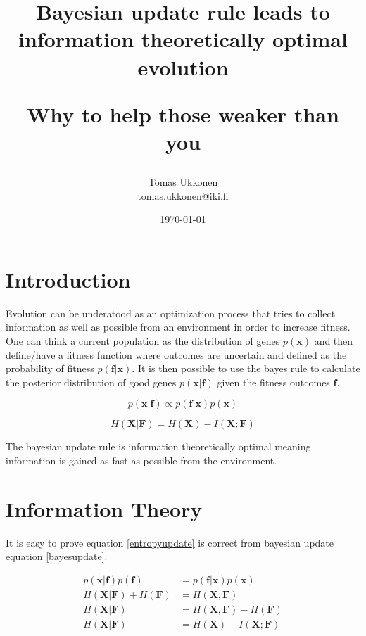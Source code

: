 \documentclass{article}
\title{Bayesian update rule leads to information theoretically optimal evolution\\ \begin{normalsize}Why to help those weaker than you\end{normalsize} }
\author{Tomas Ukkonen\\ \textrm{tomas.ukkonen@iki.fi} }
\date{\today}
\begin{document}
\maketitle

\section{Introduction} \label{introduction}

Evolution can be underatood as an optimization process that tries to collect information  \cite{infobook03} as well as possible from  an environment in order to increase fitness. One can think a current population as the distribution of genes $p(\mathbf{x})$ and then define/have a fitness function where outcomes are uncertain and defined as the probability of fitness $p(\mathbf{f}|\mathbf{x})$. It is then possible to use the bayes rule \cite{bdanalysis03} to calculate the posterior distribution of good genes $p(\mathbf{x}|\mathbf{f})$ given the fitness outcomes $\mathbf{f}$.

\begin{equation}
\label{bayesupdate}
p(\mathbf{x}|\mathbf{f}) \propto p(\mathbf{f}|\mathbf{x})p(\mathbf{x}) \end{equation}

\begin{equation}
\label{entropyupdate}
H(\mathbf{X}|\mathbf{F}) = H(\mathbf{X}) - I(\mathbf{X};\mathbf{F})
\end{equation}

The bayesian update rule is information theoretically optimal meaning information is gained as fast as possible from the environment.

\section{Information Theory}

It is easy to prove equation \ref{entropyupdate} is correct from bayesian update equation \ref{bayesupdate}.

\begin{equation*}
\begin{aligned}
p(\bm{x}|\bm{f})p(\bm{f}) &= p(\bm{f}|\bm{x})p(\bm{x})\\
H(\bm{X}|\bm{F})+H(\bm{F}) &= H(\bm{X},\bm{F}) \\
H(\bm{X}|\bm{F}) &= H(\bm{X},\bm{F}) - H(\bm{F}) \\
H(\bm{X}|\bm{F}) &= H(\bm{X}) - I(\bm{X};\bm{F})
\end{aligned}
\end{equation*}
\end{document}
